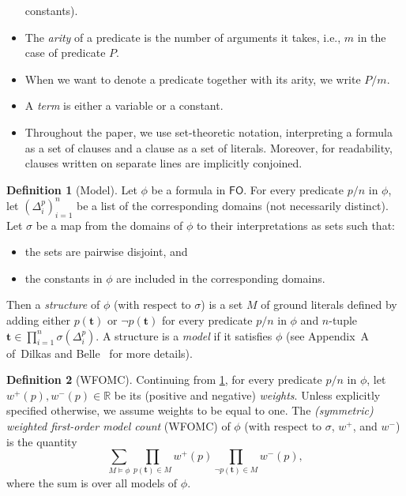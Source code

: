 \documentclass{article}
\theoremstyle{definition}
\newtheorem{definition}{Definition}
\newcommand{\FO}{$\mathsf{FO}$}
\begin{document}
\begin{itemize}
        constants).
  \item The \emph{arity} of a predicate is the number of arguments it takes,
        i.e., $m$ in the case of predicate $P$.
  \item When we want to denote a predicate together with its arity, we write
        $P/m$.
  \item A \emph{term} is either a variable or a constant.
  \item Throughout the paper, we use set-theoretic notation, interpreting a
        formula as a set of clauses and a clause as a set of literals. Moreover,
        for readability, clauses written on separate lines are implicitly
        conjoined.
\end{itemize}

\begin{definition}[Model]\label{def:model}
  Let $\phi$ be a formula in \FO{}. For every predicate $p/n$ in $\phi$, let
  ${(\Delta_{i}^{p})}_{i=1}^{n}$ be a list of the corresponding domains (not
  necessarily distinct). Let $\sigma$ be a map from the domains of $\phi$ to
  their interpretations as sets such that:
  \begin{itemize}
    \item the sets are pairwise disjoint, and
    \item the constants in $\phi$ are included in the corresponding domains.
  \end{itemize}
  Then a \emph{structure} of $\phi$ (with respect to $\sigma$) is a set $M$ of
  ground literals defined by adding either $p(\mathbf{t})$ or
  $\neg p(\mathbf{t})$ for every predicate $p/n$ in $\phi$ and $n$-tuple
  $\mathbf{t} \in \prod_{i=1}^{n} \sigma(\Delta_{i}^{p})$. A structure is a
  \emph{model} if it satisfies $\phi$ (see Appendix~A of~Dilkas and
  Belle~ for more details).
\end{definition}

\begin{definition}[WFOMC]
  Continuing from \cref{def:model}, for every predicate $p/n$ in $\phi$, let
  $w^{+}(p), w^{-}(p) \in \mathbb{R}$ be its (positive and negative)
  \emph{weights}. Unless explicitly specified otherwise, we assume weights to be
  equal to one. The \emph{(symmetric) weighted first-order model count} (WFOMC)
  of $\phi$ (with respect to $\sigma$, $w^{+}$, and $w^{-}$) is the quantity
  \[
    \sum_{M \models \phi} \prod_{p(\mathbf{t}) \in M} w^{+}(p) \prod_{\neg p(\mathbf{t}) \in M} w^{-}(p),
  \]
  where the sum is over all models of $\phi$.
\end{definition}
\end{document}

